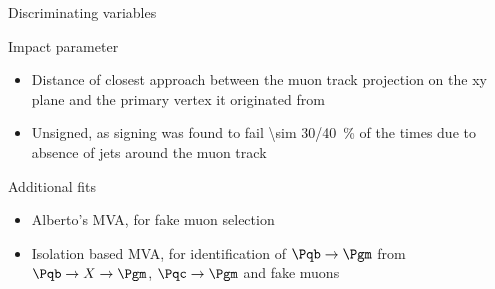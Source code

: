 \begin{frame}{Discriminating variables}
	\begin{block}{Impact parameter}
		\begin{itemize}
			\item Distance of closest approach between the muon track projection on the xy plane and the primary vertex it originated from
			\item Unsigned, as signing was found to fail \SI{\sim 30/40}{\percent} of the times due to absence of jets around the muon track
		\end{itemize}
	\end{block}
	
	\begin{block}{Additional fits}
		\begin{itemize}
			\item Alberto's MVA, for fake muon selection
			\item Isolation based MVA, for identification of $\Pqb\to\Pgm$ from  $\Pqb\to X\to\Pgm$, $\Pqc\to\Pgm$ and fake muons
		\end{itemize}
	\end{block}
\end{frame}
